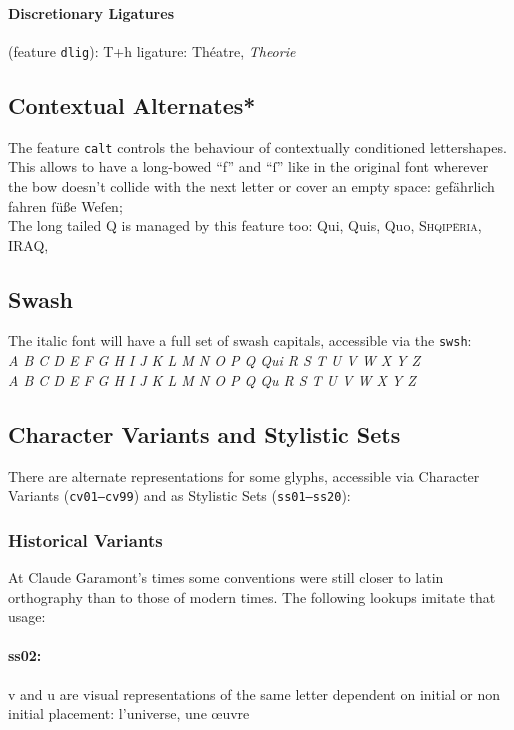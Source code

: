 \documentclass[pagesize,DIV14]{scrartcl}
\begin{document}
\paragraph*{Discretionary Ligatures} (feature \texttt{dlig}): T+h ligature:  Théatre, \textit{Theorie}

\subsection{Contextual Alternates*}
The feature \texttt{calt} controls the behaviour of contextually conditioned lettershapes. This allows to have a long-bowed \enquote{f} and \enquote{ſ} like in the original font wherever the bow doesn’t collide with the next letter or cover an empty space: gefährlich fahren ſüße Weſen;\\
The long tailed Q is managed by this feature too: Qui, Quis, Quo, \textsc{Shqipëria}, IRAQ, 

\subsection{Swash}
The italic font will have a full set of swash capitals, accessible via the \texttt{swsh}: \\\textit{A B C D E F G H I J K L M N O P Q Qui R S T U V W X Y Z\\
\scriptsize A B C D E F G H I J K L M N O P Q Qu R S T U V W X Y Z}
\subsection{Character Variants and Stylistic Sets}
There are alternate representations for some glyphs, accessible via Character Variants (\texttt{cv01–cv99}) and as Stylistic Sets (\texttt{ss01–ss20}):

\subsubsection{Historical Variants}

At Claude Garamont’s times some conventions were still closer to latin orthography than to those of modern times. The following lookups imitate that usage:

\paragraph{ss02:} v and u are visual representations of the same letter dependent on initial or non initial placement: {l’universe, une œuvre}
\end{document}
